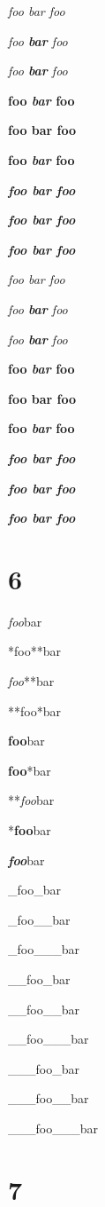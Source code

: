 \emph{foo \emph{bar} foo}

\emph{foo \textbf{bar} foo}

\emph{foo \textbf{\emph{bar}} foo}

\textbf{foo \emph{bar} foo}

\textbf{foo \textbf{bar} foo}

\textbf{foo \textbf{\emph{bar}} foo}

\textbf{\emph{foo \emph{bar} foo}}

\textbf{\emph{foo \textbf{bar} foo}}

\textbf{\emph{foo \textbf{\emph{bar}} foo}}

\emph{foo \emph{bar} foo}

\emph{foo \textbf{bar} foo}

\emph{foo \textbf{\emph{bar}} foo}

\textbf{foo \emph{bar} foo}

\textbf{foo \textbf{bar} foo}

\textbf{foo \textbf{\emph{bar}} foo}

\textbf{\emph{foo \emph{bar} foo}}

\textbf{\emph{foo \textbf{bar} foo}}

\textbf{\emph{foo \textbf{\emph{bar}} foo}}

\part{6}
\label{6}

\emph{foo}bar

*foo**bar

\emph{foo}**bar

**foo*bar

\textbf{foo}bar

\textbf{foo}*bar

**\emph{foo}bar

*\textbf{foo}bar

\textbf{\emph{foo}}bar

\_foo\_bar

\_foo\_\_bar

\_foo\_\_\_bar

\_\_foo\_bar

\_\_foo\_\_bar

\_\_foo\_\_\_bar

\_\_\_foo\_bar

\_\_\_foo\_\_bar

\_\_\_foo\_\_\_bar

\part{7}
\label{7}

